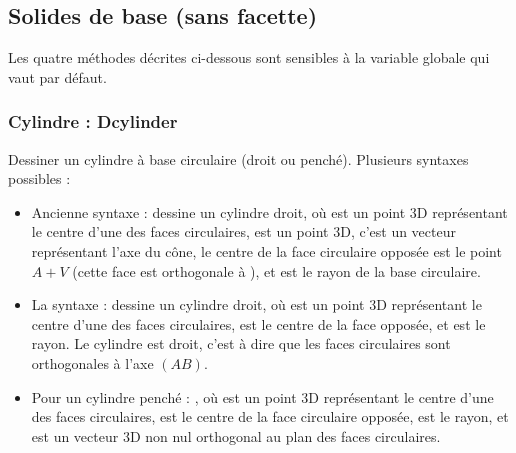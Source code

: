 \subsection{Solides de base (sans facette)}

Les quatre méthodes décrites ci-dessous sont sensibles à la variable globale  qui vaut \false par défaut.

\subsubsection{Cylindre : Dcylinder}

Dessiner un cylindre à base circulaire (droit ou penché). Plusieurs syntaxes possibles :
\begin{itemize}
    \item Ancienne syntaxe :  dessine un cylindre droit, où  est un point 3D représentant le centre d'une des faces circulaires,  est un point 3D, c'est un vecteur représentant l'axe du cône, le centre de la face circulaire opposée est le point $A+V$ (cette face est orthogonale à ), et  est le rayon de la base circulaire.
    
    \item La syntaxe :  dessine un cylindre droit, où  est un point 3D représentant le centre d'une des faces circulaires,  est le centre de la face opposée, et  est le rayon. Le cylindre est droit, c'est à dire que les faces circulaires sont orthogonales à l'axe $(AB)$.
    
    \item Pour un cylindre penché :  , où  est un point 3D représentant le centre d'une des faces circulaires,  est le centre de la face circulaire opposée,  est le rayon, et  est un vecteur 3D non nul orthogonal au plan des faces circulaires.
\end{itemize}

